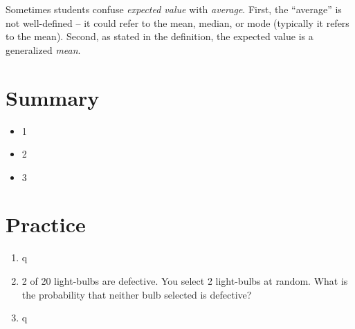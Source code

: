 \documentclass[main.tex]{subfiles}
\begin{document}
Sometimes students confuse \textit{expected value} with \textit{average}. First, the ``average'' is not well-defined -- it could refer to the mean, median, or mode (typically it refers to the mean). Second, as stated in the definition, the expected value is a generalized \textit{mean}.

\begin{defn}
	
\end{defn}

\begin{defn}
	
\end{defn}

\section{Summary}

\begin{itemize}
	\item 1
	\item 2
	\item 3
\end{itemize}

\section{Practice}

\begin{enumerate}
	\item q
	\item 2 of 20 light-bulbs are defective. You select 2 light-bulbs at random. What is the probability that neither bulb selected is defective?
	\item q
\end{enumerate}
\end{document}
